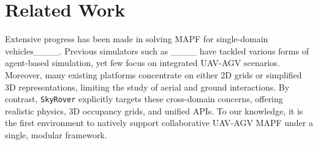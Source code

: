 \section{Related Work}
Extensive progress has been made in solving MAPF for single-domain vehicles____. 
Previous simulators such as ____ have tackled various forms of agent-based simulation, yet few focus on integrated UAV-AGV scenarios. 
Moreover, many existing platforms concentrate on either 2D grids or simplified 3D representations, limiting the study of aerial and ground interactions. 
By contrast, \texttt{SkyRover} explicitly targets these cross-domain concerns, offering realistic physics, 3D occupancy grids, and unified APIs. 
To our knowledge, it is the first environment to natively support collaborative UAV-AGV MAPF under a single, modular framework.